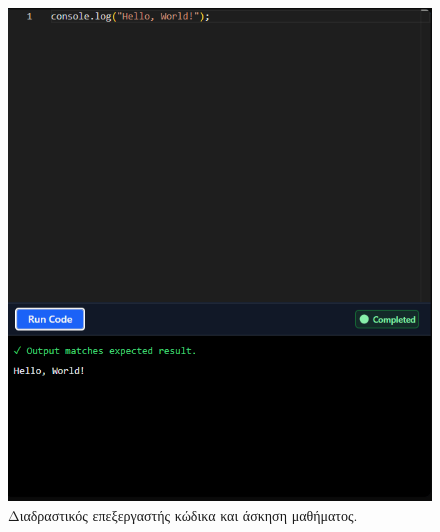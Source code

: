\begin{itemize}[leftmargin=*, noitemsep]
        \begin{figure}[h!]
          \centering
          \includegraphics[scale=0.4]{images/lesson_editor.png}
          \caption{Διαδραστικός επεξεργαστής κώδικα και άσκηση μαθήματος.}
          \label{fig:lesson_editor_placeholder}
        \end{figure}
\end{itemize}

